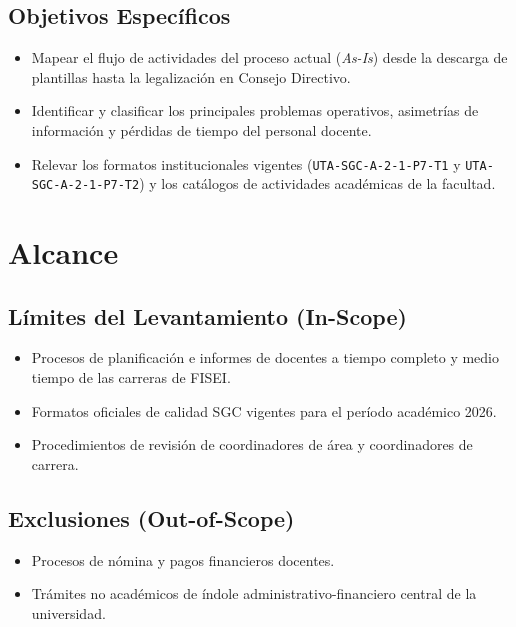 \documentclass[12pt,a4paper]{article}
\begin{document}
\subsection{Objetivos Específicos}
\begin{itemize}[leftmargin=1.5em, itemsep=1.5pt]
    \item Mapear el flujo de actividades del proceso actual (\textit{As-Is}) desde la descarga de plantillas hasta la legalización en Consejo Directivo.
    \item Identificar y clasificar los principales problemas operativos, asimetrías de información y pérdidas de tiempo del personal docente.
    \item Relevar los formatos institucionales vigentes (\texttt{UTA-SGC-A-2-1-P7-T1} y \texttt{UTA-SGC-A-2-1-P7-T2}) y los catálogos de actividades académicas de la facultad.
\end{itemize}

\section{Alcance}

\subsection{Límites del Levantamiento (In-Scope)}
\begin{itemize}[leftmargin=1.5em, itemsep=1.5pt]
    \item Procesos de planificación e informes de docentes a tiempo completo y medio tiempo de las carreras de FISEI.
    \item Formatos oficiales de calidad SGC vigentes para el período académico 2026.
    \item Procedimientos de revisión de coordinadores de área y coordinadores de carrera.
\end{itemize}

\subsection{Exclusiones (Out-of-Scope)}
\begin{itemize}[leftmargin=1.5em, itemsep=1.5pt]
    \item Procesos de nómina y pagos financieros docentes.
    \item Trámites no académicos de índole administrativo-financiero central de la universidad.
\end{itemize}
\end{document}
